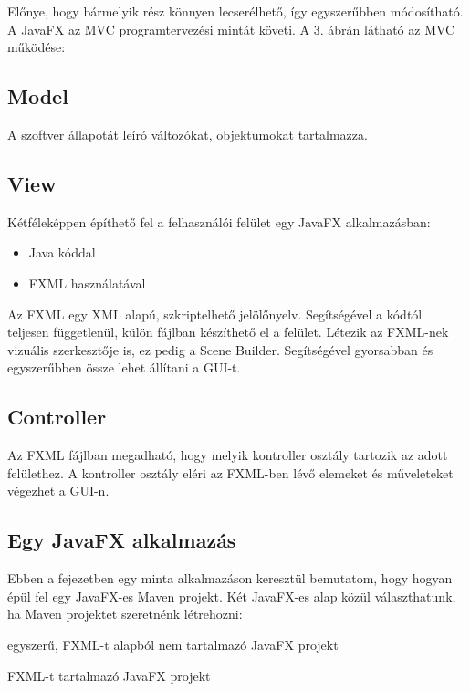 Előnye, hogy bármelyik rész könnyen lecserélhető, így egyszerűbben módosítható. A JavaFX az MVC programtervezési mintát követi. A 3. ábrán látható az MVC működése:



\subsection*{Model} 

A szoftver állapotát leíró változókat, objektumokat tartalmazza. 

\subsection*{View}

Kétféleképpen építhető fel a felhasználói felület egy JavaFX alkalmazásban: 

\begin{itemize}
\item Java kóddal 
\item FXML használatával 
\end{itemize}

Az FXML egy XML alapú, szkriptelhető jelölőnyelv. Segítségével a kódtól teljesen függetlenül, külön fájlban készíthető el a felület. Létezik az FXML-nek vizuális szerkesztője is, ez pedig a Scene Builder. Segítségével gyorsabban és egyszerűbben össze lehet állítani a GUI-t. 

\subsection*{Controller}

Az FXML fájlban megadható, hogy melyik kontroller osztály tartozik az adott felülethez. A kontroller osztály eléri az FXML-ben lévő elemeket és műveleteket végezhet a GUI-n.


\subsection{Egy JavaFX alkalmazás}

Ebben a fejezetben egy minta alkalmazáson keresztül bemutatom, hogy hogyan épül fel egy JavaFX-es Maven projekt. Két JavaFX-es alap közül választhatunk, ha Maven projektet szeretnénk létrehozni: 

egyszerű, FXML-t alapból nem tartalmazó JavaFX projekt 

FXML-t tartalmazó JavaFX projekt 

